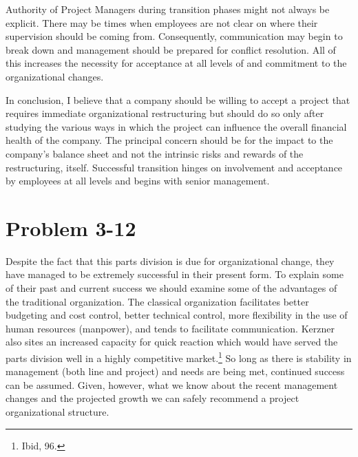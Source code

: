 \documentclass[letterpaper,10pt]{article}
\begin{document}
Authority of Project Managers during transition phases might not always be explicit.  There may be times when employees are not clear on where their supervision should be coming from.  Consequently, communication may begin to break down and management should be prepared for conflict resolution.  All of this increases the necessity for acceptance at all levels of and commitment to the organizational changes.

In conclusion, I believe that a company should be willing to accept a project that requires immediate organizational restructuring but should do so only after studying the various ways in which the project can influence the overall financial health of the company.  The principal concern should be for the impact to the company's balance sheet and not the intrinsic risks and rewards of the restructuring, itself.  Successful transition hinges on involvement and acceptance by employees at all levels and begins with senior management.

\section*{Problem 3-12}

Despite the fact that this parts division is due for organizational change, they have managed to be extremely successful in their present form.  To explain some of their past and current success we should examine some of the advantages of the traditional organization.  The classical organization facilitates better budgeting and cost control, better technical control, more flexibility in the use of human resources (manpower), and tends to facilitate communication.  Kerzner also sites an increased capacity for quick reaction which would have served the parts division well in a highly competitive market.\footnote{Ibid, 96.}  So long as there is stability in management (both line and project) and needs are being met, continued success can be assumed.  Given, however, what we know about the recent management changes and the projected growth we can safely recommend a project organizational structure.
\end{document}
